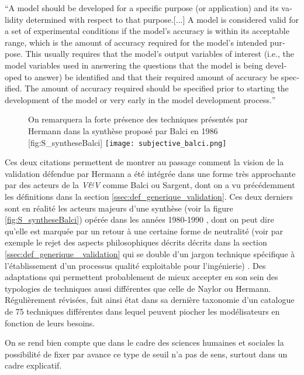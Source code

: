 \foreignquote{english}{A model should be developed for a specific purpose (or application) and its validity determined with respect to that purpose.[...] A model is considered valid for a set of experimental conditions if the model’s accuracy is within its acceptable range, which is the amount of accuracy required for the model’s intended purpose. This usually requires that the model’s output variables of interest (i.e., the model variables used in answering the questions that the model is being developed to answer) be identified and that their required amount of accuracy be specified. The amount of accuracy required should be specified prior to starting the development of the model or very early in the model development process.}\autocite[166]{Sargent2010}

\begin{figure}[h]
\begin{sidecaption}[fortoc]{ On remarquera la forte présence des techniques présentés par Hermann dans la synthèse proposé par Balci en 1986 \autocite{Balci1986}}[fig:S_syntheseBalci]
  \centering
 \texttt{[image: subjective\_balci.png]}
  \end{sidecaption}
\end{figure}

Ces deux citations permettent de montrer au passage comment la vision de la validation défendue par Hermann a été intégrée dans une forme très approchante par des acteurs de la \textit{V\&V} comme Balci ou Sargent, dont on a vu précédemment les définitions dans la section \ref{ssec:def_generique_validation}. Ces deux derniers sont en réalité les acteurs majeurs d'une synthèse (voir la figure \ref{fig:S_syntheseBalci}) opérée dans les années 1980-1990 \autocite{Nance2002}, dont on peut dire qu'elle est marquée par un retour à une certaine forme de neutralité (voir par exemple le rejet des aspects philosophiques décrits décrits dans la section \ref{ssec:def_generique_ validation}  qui se double d'un jargon technique spécifique à l'établissement d'un processus qualité exploitable pour l'ingénierie) . Des adaptations qui permettent probablement de mieux accepter en son sein des typologies de techniques aussi différentes que celle de Naylor ou Hermann. Régulièrement révisées, \textcite{Balci1998} fait ainsi état dans sa dernière taxonomie d'un catalogue de 75 techniques différentes dans lequel peuvent piocher les modélisateurs en fonction de leurs besoins. 

On se rend bien compte que dans le cadre des sciences humaines et sociales la possibilité de fixer par avance ce type de seuil n'a pas de sens, surtout dans un cadre explicatif.


